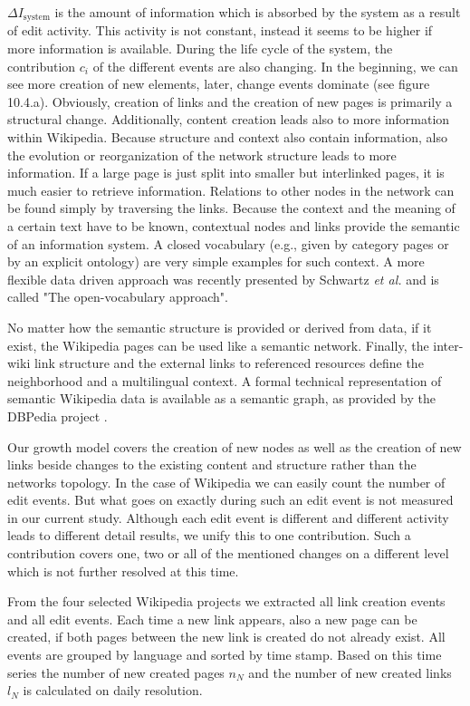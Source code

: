 \documentclass[a4paper,10pt]{scrbook}
\begin{document}
$\Delta I_{\text{system}}$ is the amount of information which is absorbed by the system as a result of edit activity. This activity is not constant, instead it seems to be higher if more information is available. During the life cycle of the system, the contribution $c_i$ of the different events are also changing. In the beginning, we can see more creation of new elements, later, change events dominate (see figure 10.4.a). Obviously, creation of links and the creation of new pages is primarily a structural change. Additionally, content creation leads also to more information within Wikipedia. Because structure and context also contain information, also the evolution or reorganization of the network structure leads to more information. If a large page is just split into smaller but interlinked pages, it is much easier to retrieve information. Relations to other nodes in the network can be found simply by traversing the links. Because the context and the meaning of a certain text have to be known, contextual nodes and links provide the semantic of an information system. A closed vocabulary (e.g., given by category pages or by an explicit ontology) are very simple examples for such context. A more flexible data driven approach was recently presented by Schwartz \textit{et al.} \cite{Schwartz2013} and is called "The open-vocabulary approach". 

No matter how the semantic structure is provided or derived from data, if it exist, the Wikipedia pages can be used like a semantic network. Finally, the inter-wiki link structure and the external links to referenced resources define the neighborhood and a multilingual context. A formal technical representation of semantic Wikipedia data is available as a semantic graph, as provided by the DBPedia project \cite{DBPedia}.

Our growth model covers the creation of new nodes as well as the creation of new links beside changes to the existing content and structure rather than the networks topology. In the case of Wikipedia we can easily count the number of edit events. But what goes on exactly during such an edit event is not measured in our current study. Although each edit event is different and different activity leads to different detail results, we unify this to one contribution. Such a contribution covers one, two or all of the mentioned changes on a different level which is not further resolved at this time.

From the four selected Wikipedia projects we extracted all link creation events and all edit events. Each time a new link appears, also a new page can be created, if both pages between the new link is created do not already exist. All events are grouped by language and sorted by time stamp. Based on this time series the number of new created pages $n_N$ and the number of new created links $l_N$ is calculated on daily resolution. 
\end{document}
